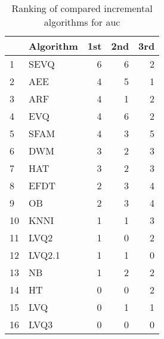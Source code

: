 \begin{table}[H]
\footnotesize
\centering
\caption{Ranking of compared incremental algorithms for auc}
\label{tab:Incremental places auc}
\begin{tabular}{llrrr}
\hline
{} & Algorithm &  1st &  2nd &  3rd \\
\hline
1  &      SEVQ &    6 &    6 &    2 \\
2  &       AEE &    4 &    5 &    1 \\
3  &       ARF &    4 &    1 &    2 \\
4  &       EVQ &    4 &    6 &    2 \\
5  &      SFAM &    4 &    3 &    5 \\
6  &       DWM &    3 &    2 &    3 \\
7  &       HAT &    3 &    2 &    3 \\
8  &      EFDT &    2 &    3 &    4 \\
9  &        OB &    2 &    3 &    4 \\
10 &      KNNI &    1 &    1 &    3 \\
11 &      LVQ2 &    1 &    0 &    2 \\
12 &    LVQ2.1 &    1 &    1 &    0 \\
13 &        NB &    1 &    2 &    2 \\
14 &        HT &    0 &    0 &    2 \\
15 &       LVQ &    0 &    1 &    1 \\
16 &      LVQ3 &    0 &    0 &    0 \\
\hline
\end{tabular}
\end{table}
